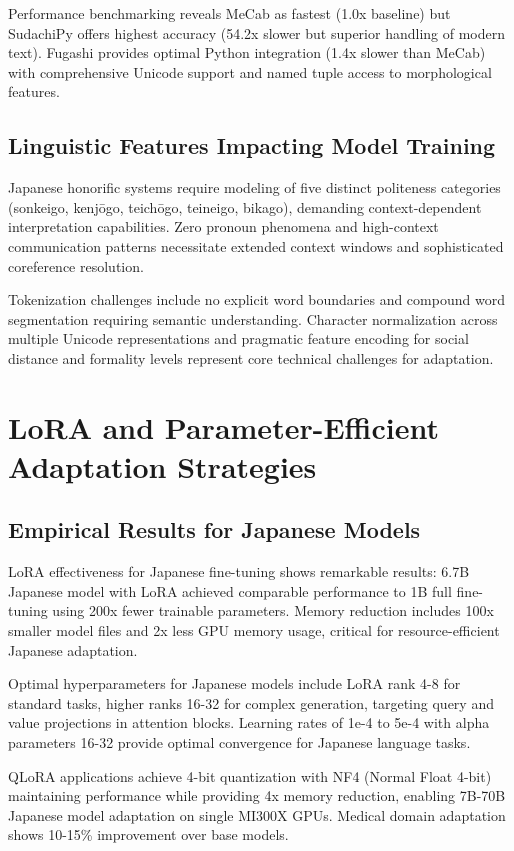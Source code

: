 \documentclass[11pt,a4paper]{article}
\begin{document}
Performance benchmarking reveals MeCab as fastest (1.0x baseline) but SudachiPy offers highest accuracy (54.2x slower but superior handling of modern text). Fugashi provides optimal Python integration (1.4x slower than MeCab) with comprehensive Unicode support and named tuple access to morphological features.

\subsection{Linguistic Features Impacting Model Training}

Japanese honorific systems require modeling of five distinct politeness categories (sonkeigo, kenjōgo, teichōgo, teineigo, bikago), demanding context-dependent interpretation capabilities. Zero pronoun phenomena and high-context communication patterns necessitate extended context windows and sophisticated coreference resolution.

Tokenization challenges include no explicit word boundaries and compound word segmentation requiring semantic understanding. Character normalization across multiple Unicode representations and pragmatic feature encoding for social distance and formality levels represent core technical challenges for adaptation.

\section{LoRA and Parameter-Efficient Adaptation Strategies}

\subsection{Empirical Results for Japanese Models}

LoRA effectiveness for Japanese fine-tuning shows remarkable results: 6.7B Japanese model with LoRA achieved comparable performance to 1B full fine-tuning using 200x fewer trainable parameters. Memory reduction includes 100x smaller model files and 2x less GPU memory usage, critical for resource-efficient Japanese adaptation.

Optimal hyperparameters for Japanese models include LoRA rank 4-8 for standard tasks, higher ranks 16-32 for complex generation, targeting query and value projections in attention blocks. Learning rates of 1e-4 to 5e-4 with alpha parameters 16-32 provide optimal convergence for Japanese language tasks.

QLoRA applications achieve 4-bit quantization with NF4 (Normal Float 4-bit) maintaining performance while providing 4x memory reduction, enabling 7B-70B Japanese model adaptation on single MI300X GPUs. Medical domain adaptation shows 10-15\% improvement over base models.
\end{document}
